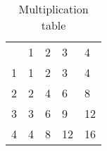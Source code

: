 \begin{table}[htbp]
\centering
\begin{tabular}{lllll}
                       & 1                      & 2                      & 3                       & 4                       \\ \cline{2-5} 
\multicolumn{1}{l|}{1} & \multicolumn{1}{l|}{1} & \multicolumn{1}{l|}{2} & \multicolumn{1}{l|}{3}  & \multicolumn{1}{l|}{4}  \\ \cline{2-5} 
\multicolumn{1}{l|}{2} & \multicolumn{1}{l|}{2} & \multicolumn{1}{l|}{4} & \multicolumn{1}{l|}{6}  & \multicolumn{1}{l|}{8}  \\ \cline{2-5} 
\multicolumn{1}{l|}{3} & \multicolumn{1}{l|}{3} & \multicolumn{1}{l|}{6} & \multicolumn{1}{l|}{9}  & \multicolumn{1}{l|}{12} \\ \cline{2-5} 
\multicolumn{1}{l|}{4} & \multicolumn{1}{l|}{4} & \multicolumn{1}{l|}{8} & \multicolumn{1}{l|}{12} & \multicolumn{1}{l|}{16} \\ \cline{2-5} 
\end{tabular}
\label{tab:multiplication_table}
\caption{Multiplication table}
\end{table}